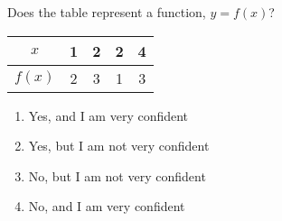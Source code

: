 \bigskip

\item Does the table represent a function, $y = f (x)$?

\begin{tabular}{|c|c|c|c|c|}
\hline
$x$ & 1 & 2 & 2 & 4 \\
\hline
$f(x)$ & 2 & 3 & 1 & 3 \\
\hline
\end{tabular}

\begin{enumerate}
\item Yes, and I am very confident  
\item Yes, but I am not very confident
\item No, but I am not very confident
\item No, and I am very confident  
\end{enumerate}

